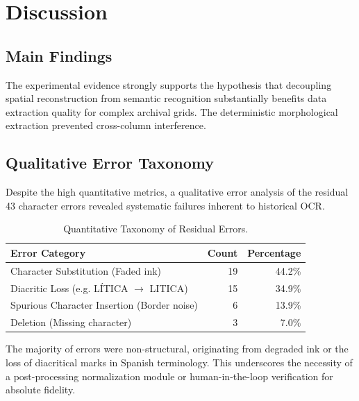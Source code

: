 \documentclass[pdflatex,sn-mathphys-num]{sn-jnl}
\begin{document}

\section{Discussion}
\label{sec:discussion}

\subsection{Main Findings}
The experimental evidence strongly supports the hypothesis that decoupling spatial reconstruction from semantic recognition substantially benefits data extraction quality for complex archival grids. The deterministic morphological extraction prevented cross-column interference.

\subsection{Qualitative Error Taxonomy}
Despite the high quantitative metrics, a qualitative error analysis of the residual 43 character errors revealed systematic failures inherent to historical OCR.

\begin{table}[htbp]
\centering
\caption{Quantitative Taxonomy of Residual Errors.}
\label{tab:errors}
\begin{tabular}{lrr}
\toprule
\textbf{Error Category} & \textbf{Count} & \textbf{Percentage} \\
\midrule
Character Substitution (Faded ink) & 19 & 44.2\% \\
Diacritic Loss (e.g. LÍTICA $\rightarrow$ LITICA) & 15 & 34.9\% \\
Spurious Character Insertion (Border noise) & 6 & 13.9\% \\
Deletion (Missing character) & 3 & 7.0\% \\
\bottomrule
\end{tabular}
\end{table}

The majority of errors were non-structural, originating from degraded ink or the loss of diacritical marks in Spanish terminology. This underscores the necessity of a post-processing normalization module or human-in-the-loop verification for absolute fidelity.

\end{document}
